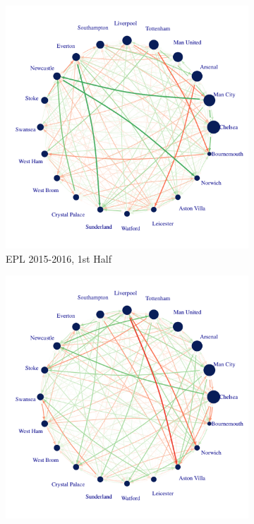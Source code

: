 \documentclass[12pt,a4paper,twoside,openany]{book}\usepackage[]{graphicx}\usepackage[]{color}
\makeatletter
\def\maxwidth{ %
  \ifdim\Gin@nat@width>\linewidth
    \linewidth
  \else
    \Gin@nat@width
  \fi
}
\newenvironment{knitrout}{}{} %
\makeatother
\begin{document}
\begin{figure}[H]
\begin{subfigure}{0.40\textwidth}
\begin{knitrout}
{\centering \includegraphics[width=\maxwidth]{figure/unnamed-chunk-11-1} 

}



\end{knitrout}
\caption{EPL 2015-2016, 1st Half}
\end{subfigure}\hspace*{\fill}
\begin{subfigure}{0.40\textwidth}
\begin{knitrout}
\color{fgcolor}

{\centering \includegraphics[width=\maxwidth]{figure/unnamed-chunk-12-1} 

}
\end{knitrout}
\end{subfigure}
\end{figure}
\end{document}
